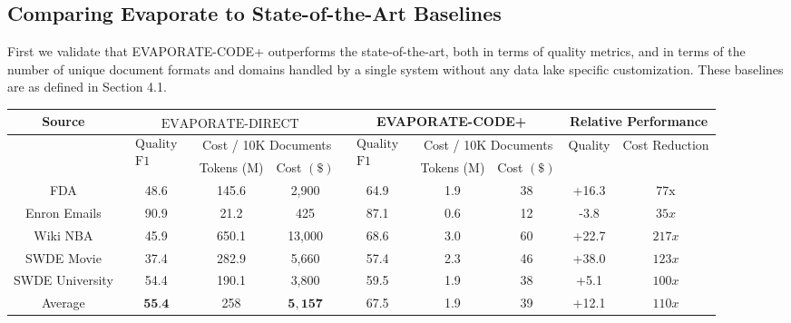 \documentclass[10pt]{article}
\begin{document}
\subsection{Comparing Evaporate to State-of-the-Art Baselines}
First we validate that EVAPORATE-CODE+ outperforms the state-of-the-art, both in terms of quality metrics, and in terms of the number of unique document formats and domains handled by a single system without any data lake specific customization. These baselines are as defined in Section 4.1.

\begin{center}
\begin{tabular}{|c|c|c|c|c|c|c|c|c|}
\hline
\multirow{3}{*}{Source} & \multicolumn{3}{|c|}{$\begin{array}{l}\text { EVAPORATE-DIRECT }\end{array}$} & \multicolumn{3}{|c|}{EVAPORATE-CODE+} & \multicolumn{2}{|c|}{Relative Performance} \\
\hline
 & \multirow{2}{*}{$\begin{array}{l}\text { Quality } \\
\text { F1 }\end{array}$} & \multicolumn{2}{|c|}{Cost / 10K Documents} & \multirow{2}{*}{$\begin{array}{l}\text { Quality } \\
\text { F1 }\end{array}$} & \multicolumn{2}{|c|}{Cost / 10K Documents} & \multirow{2}{*}{Quality} & \multirow{2}{*}{Cost Reduction} \\
\hline
 &  & Tokens (M) & Cost $(\$)$ &  & Tokens (M) & Cost $(\$)$ &  &  \\
\hline
FDA & 48.6 & 145.6 & 2,900 & 64.9 & 1.9 & 38 & +16.3 & $77 \mathrm{x}$ \\
\hline
Enron Emails & 90.9 & 21.2 & 425 & 87.1 & 0.6 & 12 & -3.8 & $35 x$ \\
\hline
Wiki NBA & 45.9 & 650.1 & 13,000 & 68.6 & 3.0 & 60 & +22.7 & $217 x$ \\
\hline
SWDE Movie & 37.4 & 282.9 & 5,660 & 57.4 & 2.3 & 46 & +38.0 & $123 x$ \\
\hline
SWDE University & 54.4 & 190.1 & 3,800 & 59.5 & 1.9 & 38 & +5.1 & $100 x$ \\
\hline
Average & $\mathbf{5 5 . 4}$ & 258 & $\mathbf{5 , 1 5 7}$ & 67.5 & 1.9 & 39 & +12.1 & $110 x$ \\
\hline
\end{tabular}
\end{center}
\end{document}
